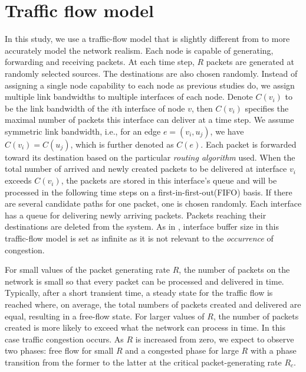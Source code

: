 \documentclass[journal]{IEEEtran}
\begin{document}
{\section{Traffic flow model}\label{model}
 In this study, we use a traffic-flow model that is slightly
 different from
\cite{efficient-routing, edge-deletion,
onset-traffic-congestion,Danila06} to more accurately model the
network realism. Each node is capable of generating, forwarding and
receiving packets. At each time step, $R$ packets are generated at
randomly selected sources. The destinations are also chosen
randomly. Instead of assigning a single node capability to each node
as previous studies do, we assign multiple link bandwidths to
multiple interfaces of each node. Denote $C(v_i)$ to be the link
bandwidth of the $i$th interface of node $v$, then $C(v_i)$
specifies the maximal number of packets this interface can deliver
at a time step. We assume symmetric link bandwidth, i.e., for an
edge $e=(v_i, u_j)$, we have $C(v_i)=C(u_j)$, which is further
denoted as $C(e)$.  Each packet is forwarded toward its destination
based on the particular \emph{routing algorithm} used. When the
total number of arrived and newly created packets to be delivered at
interface $v_i$ exceeds $C(v_i)$, the packets are stored in this
interface's queue and will be processed in the following time steps
on a first-in-first-out(FIFO) basis. If there are several candidate
paths for one packet, one is chosen randomly. Each interface has a
queue for delivering newly arriving packets. Packets reaching their
destinations are deleted from the system. As in
\cite{efficient-routing, edge-deletion,
onset-traffic-congestion,Danila06}, interface buffer size in this
traffic-flow model is set as infinite as it is not relevant to the
\emph{occurrence} of congestion.

For small values of the packet generating rate $R$, the number of
packets on the network is small so that every packet can be
processed and delivered in time. Typically, after a short transient
time, a steady state for the traffic flow is reached where, on
average, the total numbers of packets created and delivered are
equal, resulting in a free-flow state. For larger values of $R$, the
number of packets created is more likely to exceed what the network
can process in time. In this case traffic congestion occurs. As $R$
is increased from zero, we expect to observe two phases: free flow
for small $R$ and a congested phase for large $R$ with a phase
transition from the former to the latter at the critical
packet-generating rate $R_c$.

}
\end{document}
